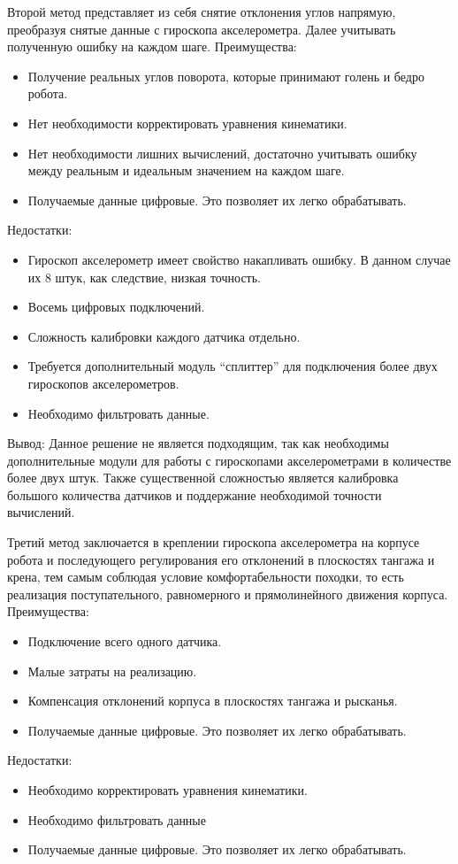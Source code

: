 Второй метод представляет из себя снятие отклонения углов напрямую, преобразуя снятые данные с гироскопа акселерометра. Далее учитывать полученную ошибку на каждом шаге.
\newline
Преимущества:
\begin{itemize}
	\item Получение реальных углов поворота, которые принимают голень и бедро робота.
	\item Нет необходимости корректировать уравнения кинематики.
	\item Нет необходимости лишних вычислений, достаточно учитывать ошибку между реальным и идеальным значением на каждом шаге.
	\item Получаемые данные цифровые. Это позволяет их легко обрабатывать.
\end{itemize}
Недостатки:
\begin{itemize}
	\item Гироскоп акселерометр имеет свойство накапливать ошибку. В данном случае их 8 штук, как следствие, низкая точность.
	\item Восемь цифровых подключений.
	\item Сложность калибровки каждого датчика отдельно.
	\item Требуется дополнительный модуль ``сплиттер'' для подключения более двух гироскопов акселерометров.
	\item Необходимо фильтровать данные.
\end{itemize}
Вывод:
Данное решение не является подходящим, так как необходимы дополнительные модули для работы с гироскопами акселерометрами в количестве более двух штук. Также существенной сложностью является калибровка большого количества датчиков и поддержание необходимой точности вычислений.
\newline


Третий метод заключается в креплении гироскопа акселерометра на корпусе робота и последующего регулирования его отклонений в плоскостях тангажа и крена, тем самым соблюдая условие комфортабельности походки, то есть реализация поступательного, равномерного и прямолинейного движения корпуса.
\newline
Преимущества:
\begin{itemize}
	\item Подключение всего одного датчика.
	\item Малые затраты на реализацию.
	\item Компенсация отклонений корпуса в плоскостях тангажа и рысканья.
	\item Получаемые данные цифровые. Это позволяет их легко обрабатывать.
\end{itemize}
Недостатки:
\begin{itemize}
	\item Необходимо корректировать уравнения кинематики.
	\item Необходимо фильтровать данные
	\item Получаемые данные цифровые. Это позволяет их легко обрабатывать.
\end{itemize}

